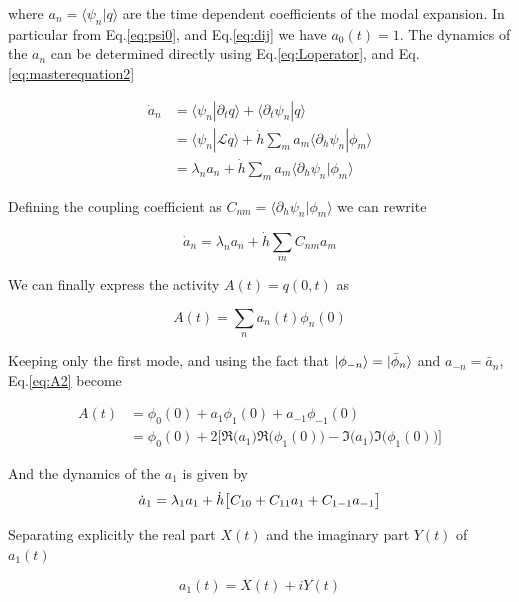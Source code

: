 \documentclass[12pt,twoside]{report}
\begin{document}
where $a_n=\langle \psi_n | q\rangle$ are the time dependent coefficients of the modal expansion. In particular from Eq.\eqref{eq:psi0}, and Eq.\eqref{eq:dij} we have $a_0(t)=1$. The dynamics of the $a_n$ can be determined directly using Eq.\eqref{eq:Loperator}, and Eq.\eqref{eq:masterequation2}

\begin{align}
\dot{a}_n&=\langle\psi_n|\partial_t q\rangle+\langle\partial_t\psi_n|q\rangle \nonumber \\
&=\langle\psi_n|\mathcal{L}q\rangle+  \dot{h}\sum_ma_m\langle\partial_h\psi_n|\phi_m \rangle \nonumber \\
&=\lambda_n a_n +  \dot{h}\sum_ma_m\langle\partial_h\psi_n|\phi_m \rangle 
\end{align}

Defining the coupling coefficient as $C_{nm}=\langle\partial_h\psi_n|\phi_m \rangle $ we can rewrite

\begin{equation}
\dot{a}_n=\lambda_n a_n +  \dot{h}\sum_mC_{nm}a_m 
\end{equation}



We can finally express the activity $A(t)=q(0,t)$ as

\begin{equation}
\label{eq:A2}
A(t)=\sum_na_n(t)\phi_n(0)
\end{equation}

Keeping only the first mode, and using the fact that $\ket{\phi_{-n}}=\ket{\bar{\phi}_n}$ and $a_{-n}=\bar{a}_n$,  Eq.\eqref{eq:A2} become

\begin{align}
\label{eq:A3}
A(t)&=\phi_0(0) + a_1\phi_1(0) +a_{-1}\phi_{-1}(0) \nonumber \\
&=\phi_0(0) + 2\big[\Re\big(a_1\big)\Re\big(\phi_1(0)\big)- \Im\big(a_1\big)\Im\big(\phi_1(0)\big)\big] 
\end{align}


And the dynamics of the $a_1$ is given by
\begin{equation}
\label{eq:a1}
\dot{a}_1=\lambda_1 a_1 + \dot{h}\big[C_{10}+C_{11}a_1+C_{1-1}a_{-1}\big] \nonumber \\
\end{equation}

Separating explicitly the real part $X(t)$ and the imaginary part  $Y(t)$ of $a_1(t)$

\begin{equation}
\label{eq:a1xy}
a_1(t)= X(t) +i Y(t)
\end{equation}
\end{document}
